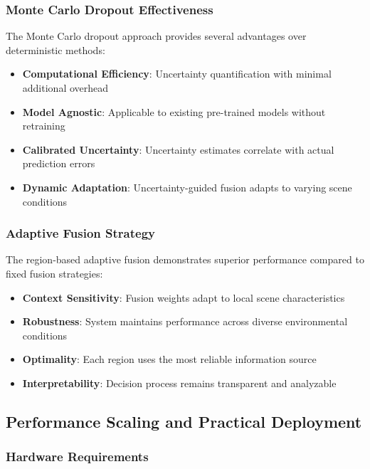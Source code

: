 \documentclass[10pt]{article}
\begin{document}
\subsubsection{Monte Carlo Dropout Effectiveness}

The Monte Carlo dropout approach provides several advantages over deterministic methods:

\begin{itemize}
\item \textbf{Computational Efficiency}: Uncertainty quantification with minimal additional overhead
\item \textbf{Model Agnostic}: Applicable to existing pre-trained models without retraining
\item \textbf{Calibrated Uncertainty}: Uncertainty estimates correlate with actual prediction errors
\item \textbf{Dynamic Adaptation}: Uncertainty-guided fusion adapts to varying scene conditions
\end{itemize}

\subsubsection{Adaptive Fusion Strategy}

The region-based adaptive fusion demonstrates superior performance compared to fixed fusion strategies:

\begin{itemize}
\item \textbf{Context Sensitivity}: Fusion weights adapt to local scene characteristics
\item \textbf{Robustness}: System maintains performance across diverse environmental conditions
\item \textbf{Optimality}: Each region uses the most reliable information source
\item \textbf{Interpretability}: Decision process remains transparent and analyzable
\end{itemize}

\subsection{Performance Scaling and Practical Deployment}

\subsubsection{Hardware Requirements}
\end{document}

